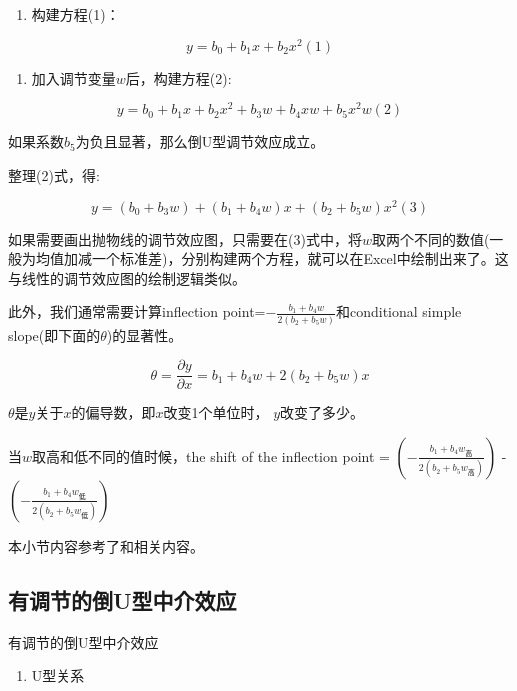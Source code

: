 \documentclass[
]{book}
\providecommand{\tightlist}{%
  \setlength{\itemsep}{0pt}\setlength{\parskip}{0pt}}
\begin{document}
\begin{enumerate}
\def\labelenumi{\arabic{enumi}.}
\tightlist
\item
  构建方程(1)：
\end{enumerate}

\[
y=b_{0}+b_{1}x+b_{2}x^{2}(1)
\]

\begin{enumerate}
\def\labelenumi{\arabic{enumi}.}
\setcounter{enumi}{1}
\tightlist
\item
  加入调节变量\(w\)后，构建方程(2):
\end{enumerate}

\[
y=b_{0}+b_{1}x+b_{2}x^{2}+b_{3}w+b_{4}xw+b_{5}x^{2}w(2)
\]

如果系数\(b_{5}\)为负且显著，那么倒U型调节效应成立。

整理(2)式，得:

\[
y=(b_{0}+b_{3}w)+(b_{1}+b_{4}w)x+(b_{2}+b_{5}w)x^{2}(3)
\]

如果需要画出抛物线的调节效应图，只需要在(3)式中，将\(w\)取两个不同的数值(一般为均值加减一个标准差)，分别构建两个方程，就可以在Excel中绘制出来了。这与线性的调节效应图的绘制逻辑类似。

此外，我们通常需要计算inflection point=\(-\frac{b_{1}+b_{4}w}{2(b_{2}+b_{5}w)}\)和conditional simple slope(即下面的\(\theta\))的显著性。

\[
\theta=\frac{\partial y}{\partial x}=b_{1}+b_{4}w+2(b_{2}+b_{5}w)x
\]

\(\theta\)是\(y\)关于\(x\)的偏导数，即\(x\)改变1个单位时， \(y\)改变了多少。

当\(w\)取高和低不同的值时候，the shift of the inflection point = \((-\frac{b_{1}+b_{4}w_{高}}{2(b_{2}+b_{5}w_{高})})\) - \((-\frac{b_{1}+b_{4}w_{低}}{2(b_{2}+b_{5}w_{低})})\)

本小节内容参考了\autocite{Lin2017:RNG}和\autocite{Hu2019:RNG}相关内容。

\hypertarget{ux6709ux8c03ux8282ux7684ux5012uux578bux4e2dux4ecbux6548ux5e94}{%
\subsection{有调节的倒U型中介效应}\label{ux6709ux8c03ux8282ux7684ux5012uux578bux4e2dux4ecbux6548ux5e94}}

有调节的倒U型中介效应

\begin{enumerate}
\def\labelenumi{\arabic{enumi}.}
\tightlist
\item
  U型关系
\end{enumerate}
\end{document}
